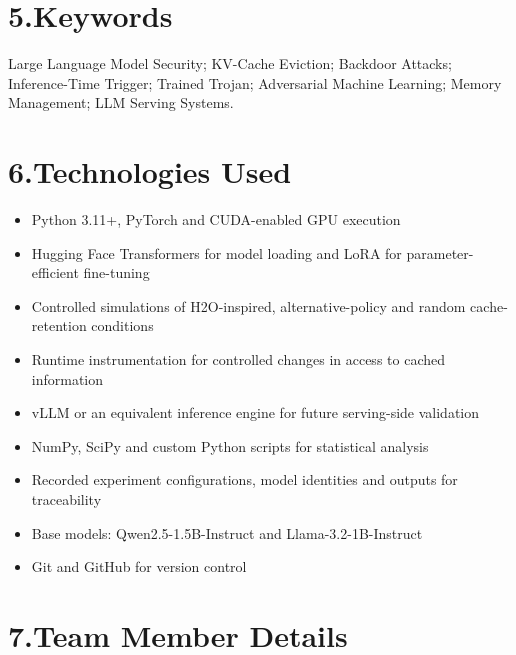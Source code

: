 \documentclass[11pt,a4paper]{article}
\begin{document}
\section*{5.\quad Keywords}
Large Language Model Security; KV-Cache Eviction; Backdoor Attacks; Inference-Time Trigger; Trained Trojan; Adversarial Machine Learning; Memory Management; LLM Serving Systems.

\section*{6.\quad Technologies Used}
\begin{itemize}[nosep]
  \item Python 3.11+, PyTorch and CUDA-enabled GPU execution
  \item Hugging Face Transformers for model loading and LoRA for parameter-efficient fine-tuning
  \item Controlled simulations of H2O-inspired, alternative-policy and random cache-retention conditions
  \item Runtime instrumentation for controlled changes in access to cached information
  \item vLLM or an equivalent inference engine for future serving-side validation
  \item NumPy, SciPy and custom Python scripts for statistical analysis
  \item Recorded experiment configurations, model identities and outputs for traceability
  \item Base models: Qwen2.5-1.5B-Instruct and Llama-3.2-1B-Instruct
  \item Git and GitHub for version control
\end{itemize}

\section*{7.\quad Team Member Details}
\end{document}
